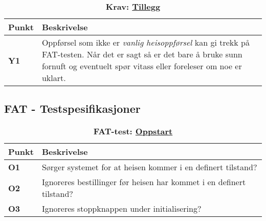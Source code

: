 \begin{table}[H]
    \centering
    \caption*{\textbf{\textcolor{NTNU_blue}{Krav}: \underline{Tillegg}}}
    \begin{tabular}{@{}  |p{1.25cm}| p{12.25cm}|  @{}}
    \hline
      \textbf{Punkt}             & \textbf{Beskrivelse} \\
    \hline
    \textbf{\textcolor{NTNU_blue}{Y1}} & Oppførsel som ikke er \textit{vanlig heisoppførsel} kan gi trekk på FAT-testen. Når det er sagt så er det bare å bruke sunn fornuft og eventuelt spør vitass eller foreleser om noe er uklart.\\\cline{1-2} 
    \end{tabular}
\end{table}

\subsection{FAT - Testspesifikasjoner}\label{app:FAT-test}

\begin{table}[H]
    \centering
    \caption*{\textbf{\textcolor{RWTHrot100}{FAT-test}: \underline{Oppstart}}}
    \begin{tabular}{@{}  |p{1.25cm}| p{12.25cm}|  @{}}
    \hline
      \textbf{Punkt}             & \textbf{Beskrivelse} \\
    \hline
    \textbf{\textcolor{RWTHrot100}{O1}} & Sørger systemet for at heisen kommer i en definert tilstand?\\\cline{1-2} 
    \textbf{\textcolor{RWTHrot100}{O2}} & Ignoreres bestillinger før heisen har kommet i en definert tilstand?\\\cline{1-2} 
    \textbf{\textcolor{RWTHrot100}{O3}} & Ignoreres stoppknappen under initialisering?\\\cline{1-2} 
    \end{tabular}
\end{table}


